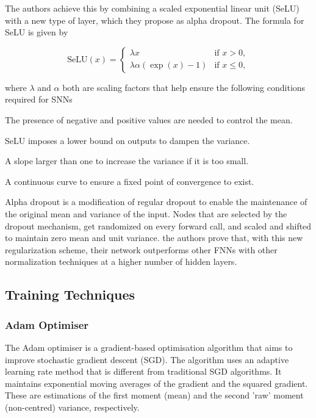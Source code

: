 \noindent The authors achieve this by combining a scaled exponential linear unit (SeLU) with a new type of layer, which they propose as alpha dropout. The formula for SeLU is given by

\[
\mathrm{SeLU}(x) = \begin{cases}
  \lambda x & \text{if } x > 0, \\
  \lambda \alpha (\exp(x) - 1) & \text{if } x \leq 0,
\end{cases}
\]

\noindent where \(\lambda\) and \(\alpha\) both are scaling factors that help ensure the following conditions required for SNNs

\begin{compactitem}
    \item The presence of negative and positive values are needed to control the mean.
    \item SeLU imposes a lower bound on outputs to dampen the variance.
    \item A slope larger than one to increase the variance if it is too small.
    \item A continuous curve to ensure a fixed point of convergence to exist.
\end{compactitem}

\noindent Alpha dropout is a modification of regular dropout to enable the maintenance of the original mean and variance of the input. Nodes that are selected by the dropout mechanism, get randomized on every forward call, and scaled and shifted to maintain zero mean and unit variance. the authors prove that, with this new regularization scheme, their network outperforms other FNNs with other normalization techniques at a higher number of hidden layers. \cite{Klambauer2017Self}


\subsection{Training Techniques}


\subsubsection{Adam Optimiser}
The Adam optimiser is a gradient-based optimisation algorithm that aims to improve stochastic gradient descent (SGD). The algorithm uses an adaptive learning rate method that is different from traditional SGD algorithms. It maintains exponential moving averages of the gradient and the squared gradient. These are estimations of the first moment (mean) and the second 'raw' moment (non-centred) variance, respectively.

